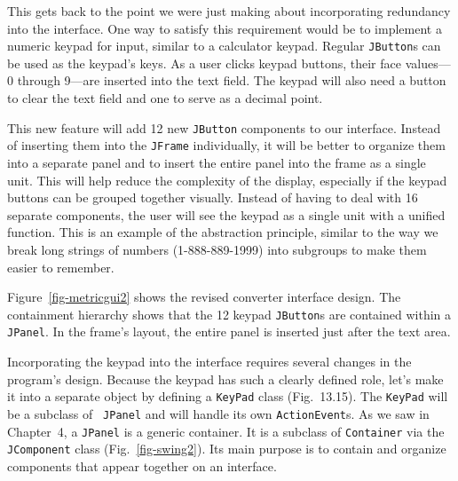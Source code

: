 This gets back to the point we were just making about incorporating
redundancy into the interface.  One way to satisfy this requirement
would be to implement a numeric keypad for input, similar to a
calculator keypad.  Regular {\tt JButton}s can be used as the keypad's
keys.  As a user clicks keypad buttons, their face values---0 through
9---are inserted into the text field.  The keypad will also need a
button to clear the text field and one to serve as a decimal point.

This new feature will add 12 new {\tt JButton} components to our
interface.  Instead of inserting them into the {\tt JFrame}
individually, it will be better to organize them into a separate
panel and to insert the entire panel into the frame as a single
unit.  This will help reduce the complexity of the display, especially
if the keypad buttons can be grouped together visually.   Instead of
having to deal with 16 separate components, the user will see the
keypad as a single unit with a unified function.  This is an example of
the abstraction principle, similar to the way we break long
strings of numbers (1-888-889-1999) into subgroups to make them easier
to remember.


\noindent Figure~\ref{fig-metricgui2} shows the revised  
converter interface design.  The containment hierarchy shows that the 12
keypad {\tt JButton}s are contained within a {\tt JPanel}. In the
frame's layout, the entire panel is inserted just after the text area.


\begin{figure}[tb]
\end{figure}

Incorporating the keypad into the interface requires several changes
in the program's design. Because the keypad has such a clearly defined
role, let's make it into a separate object by defining a {\tt KeyPad}
class (Fig.~13.15). The {\tt KeyPad} will be a subclass of {\tt
JPanel} and will handle its own {\tt ActionEvent}s.  As we saw in
Chapter~4, a {\tt JPanel} is a generic container.  It is a subclass of
{\tt Container} via the {\tt JComponent} class
(Fig.~\ref{fig-swing2}).  Its main purpose is to contain and organize
components that appear together on an interface.

